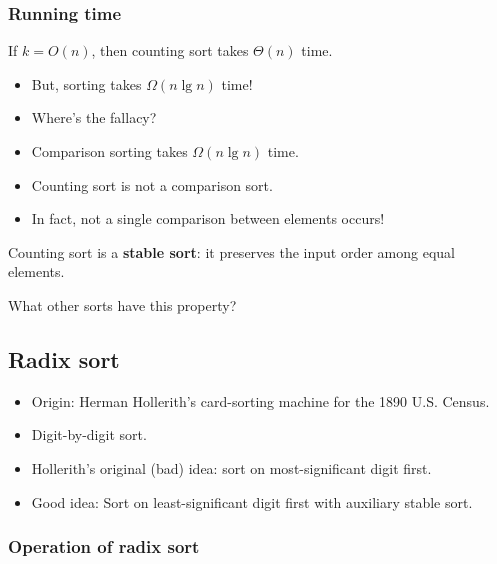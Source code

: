 \documentclass[11pt,toc=twocol]{elegantbook}
\begin{document}
\subsubsection{Running time}
If $k=O(n)$, then counting sort takes $\Theta(n)$ time.
\begin{itemize}
    \item But, sorting takes $\Omega(n \lg n)$ time! 
    \item Where's the fallacy?
\end{itemize}
\begin{solution}
    \begin{itemize}
        \item Comparison sorting takes $\Omega(n \lg n)$ time.
        \item Counting sort is not a comparison sort.
        \item In fact, not a single comparison between elements occurs!
    \end{itemize}
\end{solution}
\begin{definition}
    Counting sort is a \textbf{stable sort}: it preserves the input order among equal elements.
\end{definition}
\begin{exercise}
    What other sorts have this property?
\end{exercise}
\subsection{Radix sort}
\begin{note}
    \begin{itemize}
        \item Origin: Herman Hollerith's card-sorting machine for the 1890 U.S. Census. 
        \item Digit-by-digit sort.
        \item Hollerith's original (bad) idea: sort on most-significant digit first.
        \item Good idea: Sort on least-significant digit first with auxiliary stable sort.
    \end{itemize}
\end{note}
\subsubsection{Operation of radix sort}
\end{document}
